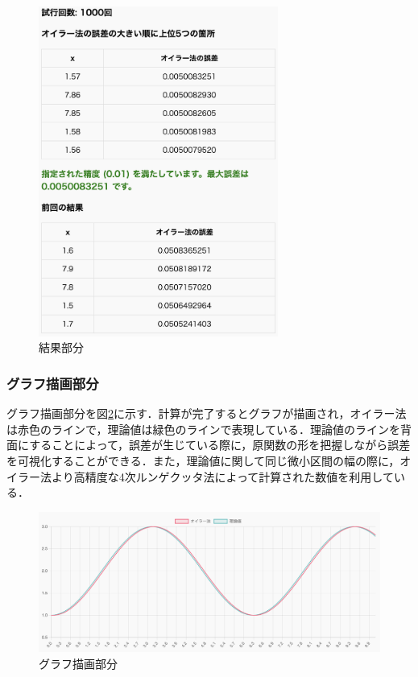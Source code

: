 \documentclass[a4paper, 12pt]{ltjsarticle}
\begin{document}
\begin{figure}[h]
\begin{center}
\includegraphics[clip,width=0.7\textwidth,keepaspectratio]{sim-kekka.png}
\end{center}
\caption{結果部分}
\label{fig:結果部分}
\end{figure}

\clearpage

\subsubsection{グラフ描画部分}
グラフ描画部分を図\ref{fig:グラフ描画部分}に示す．計算が完了するとグラフが描画され，オイラー法は赤色のラインで，理論値は緑色のラインで表現している．理論値のラインを背面にすることによって，誤差が生じている際に，原関数の形を把握しながら誤差を可視化することができる．また，理論値に関して同じ微小区間の幅の際に，オイラー法より高精度な4次ルンゲクッタ法によって計算された数値を利用している．

\begin{figure}[h]
\begin{center}
\includegraphics[clip,width=\textwidth,keepaspectratio]{sim-gurafu.png}
\end{center}
\caption{グラフ描画部分}
\label{fig:グラフ描画部分}
\end{figure}
\end{document}
